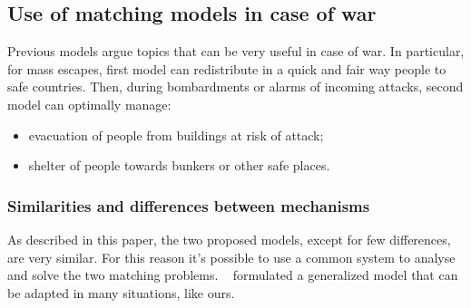 \subsection{Use of matching models in case of war}\label{use-of-matching-model-in-case-of-war}%


Previous models argue topics that can be very useful in case of war. In particular, for mass escapes, first model can redistribute in a quick and fair way people to safe countries. Then, during bombardments or alarms of incoming attacks, second model can optimally manage:

\begin{itemize}
    \item evacuation of people from buildings at risk of attack;
    \item shelter of people towards bunkers or other safe places.
\end{itemize}


\subsubsection{Similarities and differences between mechanisms}\label{similarities-and-differences-between-mechanisms}

As described in this paper, the two proposed models, except for few differences, are very similar. For this reason it's possible to use a common system to analyse and solve the two matching problems. ~\citet{delacretaz_2020} formulated a generalized model that can be adapted in many situations, like ours.
